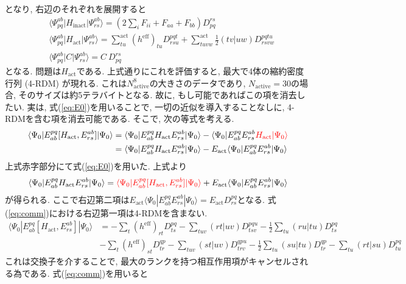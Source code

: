 \documentclass[11pt,pra,aps]{revtex4}
\newcommand{\red}[1]{\textcolor{red}{#1}}
\begin{document}
となり, 右辺のそれぞれを展開すると
\begin{align}
  &\langle\Psi_{pq}^{ab}|H_\text{inact}|\Psi_{rs}^{ab}\rangle=\left(2\sum_i F_{ii}+F_{aa}+F_{bb}\right)D^{rs}_{pq} \label{eq:inact} \\
  &\langle\Psi_{pq}^{ab}|H_\text{act}  |\Psi_{rs}^{ab}\rangle=\sum_{tu}^\text{act} (h^\text{eff})_{tu} D^{pqt}_{rsu} + \sum_{tuvw}^\text{act} \frac{1}{2}(tv|uw) D^{pqtu}_{rsvw} \label{eq:nocommH0}\\ 
  &\langle\Psi_{pq}^{ab}|C|\Psi_{rs}^{ab}\rangle=C \ D^{rs}_{pq} \label{eq:C-Dyall}
\end{align}
となる. 問題は$H_\text{act}$である. 上式通りにこれを評価すると, 最大で4体の縮約密度行列 (4-RDM) が現れる. これは$N_\text{active}^8$の大きさのデータであり, $N_\text{active}=30$の場合, そのサイズは約5テラバイトとなる. 故に, もし可能であればこの項を消去したい. 実は, 式(\ref{eq:E0})を用いることで, 一切の近似を導入することなしに, 4-RDMを含む項を消去可能である. そこで, 次の等式を考える. 
\begin{align}
  \langle\Psi_0|E^{pq}_{ab}[H_\text{act},E_{rs}^{ab}]|\Psi_0\rangle&=\langle\Psi_0|E^{pq}_{ab}H_\text{act}E_{rs}^{ab}|\Psi_0\rangle-\langle\Psi_0|E^{pq}_{ab}E_{rs}^{ab}\red{H_\text{act}|\Psi_0\rangle} \nonumber \\
  &=\langle\Psi_0|E^{pq}_{ab}H_\text{act}E_{rs}^{ab}|\Psi_0\rangle-E_\text{act}\langle\Psi_0|E^{pq}_{ab}E_{rs}^{ab}|\Psi_0\rangle
\end{align}
上式赤字部分にて式(\ref{eq:E0})を用いた. 上式より
\begin{align}
  \langle\Psi_0|E^{pq}_{ab}H_\text{act}E_{rs}^{ab}|\Psi_0\rangle=\red{\langle\Psi_0|E^{pq}_{ab}[H_\text{act},E_{rs}^{ab}]|\Psi_0\rangle}+E_\text{act}\langle\Psi_0|E^{pq}_{ab}E_{rs}^{ab}|\Psi_0\rangle \label{eq:comm}
\end{align}
が得られる. ここで右辺第二項は$E_\text{act}\langle\Psi_0|E^{pq}_{ab}E_{rs}^{ab}|\Psi_0\rangle=E_\text{act}D^{pq}_{rs}$となる. 式(\ref{eq:comm})における右辺第一項は4-RDMを含まない. 
\begin{align}
  \langle\Psi_0|E^{pq}_{ab}[H_\text{act},E_{rs}^{ab}]|\Psi_0\rangle &= - \sum_{t} (h^\text{eff})_{rt} D^{pq}_{ts} - \sum_{tuv} (rt|uv) D^{pqu}_{tsv} - \frac{1}{2} \sum_{tu} (ru|tu) D^{pq}_{ts} \nonumber \\
  &- \sum_{t} (h^\text{eff})_{st} D^{qp}_{tr} - \sum_{tuv} (st|uv) D^{qpu}_{trv} - \frac{1}{2} \sum_{tu} (su|tu) D^{qp}_{tr} - \sum_{tu} (rt|su) D^{pq}_{tu} \label{eq:comm-wick}
\end{align}
これは交換子を介することで, 最大のランクを持つ相互作用項がキャンセルされる為である. 式(\ref{eq:comm})を用いると
\end{document}
